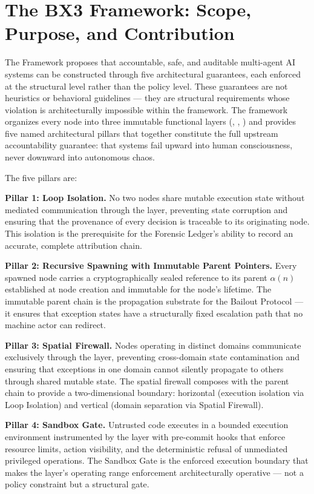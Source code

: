 \section{The BX3 Framework: Scope, Purpose, and Contribution}\label{sec:framework-scope}

The \bxthree{} Framework proposes that accountable, safe, and auditable multi-agent AI systems can be constructed through five architectural guarantees, each enforced at the structural level rather than the policy level.  These guarantees are not heuristics or behavioral guidelines --- they are structural requirements whose violation is architecturally impossible within the framework.  The framework organizes every node into three immutable functional layers (\purpose{}, \bounds{}, \fact{}) and provides five named architectural pillars that together constitute the full upstream accountability guarantee: that \bxthree{} systems fail upward into human consciousness, never downward into autonomous chaos.

The five pillars are:

\textbf{Pillar 1: Loop Isolation.}  No two nodes share mutable execution state without mediated communication through the \fact{} layer, preventing state corruption and ensuring that the provenance of every decision is traceable to its originating node.  This isolation is the prerequisite for the Forensic Ledger's ability to record an accurate, complete attribution chain.

\textbf{Pillar 2: Recursive Spawning with Immutable Parent Pointers.}  Every spawned node carries a cryptographically sealed reference to its parent $\alpha(n)$ established at node creation and immutable for the node's lifetime.  The immutable parent chain is the propagation substrate for the Bailout Protocol --- it ensures that exception states have a structurally fixed escalation path that no machine actor can redirect.

\textbf{Pillar 3: Spatial Firewall.}  Nodes operating in distinct domains communicate exclusively through the \fact{} layer, preventing cross-domain state contamination and ensuring that exceptions in one domain cannot silently propagate to others through shared mutable state.  The spatial firewall composes with the parent chain to provide a two-dimensional boundary: horizontal (execution isolation via Loop Isolation) and vertical (domain separation via Spatial Firewall).

\textbf{Pillar 4: Sandbox Gate.}  Untrusted code executes in a bounded execution environment instrumented by the \fact{} layer with pre-commit hooks that enforce resource limits, action visibility, and the deterministic refusal of unmediated privileged operations.  The Sandbox Gate is the enforced execution boundary that makes the \bounds{} layer's operating range enforcement architecturally operative --- not a policy constraint but a structural gate.

